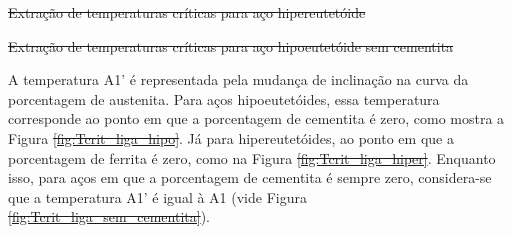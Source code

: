 \documentclass[brazil,tf,epusp]{usp}  %
\providecommand{\DIFadd}[1]{{\protect\color{blue}\uwave{#1}}} %
\providecommand{\DIFdel}[1]{{\protect\color{red}\sout{#1}}}                      %
\providecommand{\DIFaddbegin}{} %
\providecommand{\DIFaddend}{} %
\providecommand{\DIFdelbegin}{} %
\providecommand{\DIFdelend}{} %
\providecommand{\DIFdelFL}[1]{\DIFdel{#1}} %
\begin{document}
{%
\DIFdelFL{Extração de temperaturas críticas para aço hipereutetóide}}

{%
\DIFdelFL{Extração de temperaturas críticas para aço hipoeutetóide sem cementita}}

\DIFdelend A temperatura A1' é representada pela mudança de inclinação na curva da porcentagem de austenita. Para aços hipoeutetóides, essa temperatura corresponde ao ponto em que a porcentagem de cementita é zero, como mostra a Figura \DIFdelbegin \DIFdel{\ref{fig:Tcrit_liga_hipo}}\DIFdelend \DIFaddbegin \DIFadd{\ref{fig:Tcrit_exemplos}a}\DIFaddend . Já para hipereutetóides, ao ponto em que a porcentagem de ferrita é zero, como na Figura \DIFdelbegin \DIFdel{\ref{fig:Tcrit_liga_hiper}}\DIFdelend \DIFaddbegin \DIFadd{\ref{fig:Tcrit_exemplos}b}\DIFaddend . Enquanto isso, para aços em que a porcentagem de cementita é sempre zero, considera-se que a temperatura A1' é igual à A1 (vide Figura \DIFdelbegin \DIFdel{\ref{fig:Tcrit_liga_sem_cementita}}\DIFdelend \DIFaddbegin \DIFadd{\ref{fig:Tcrit_exemplos}c}\DIFaddend ).
\end{document}
